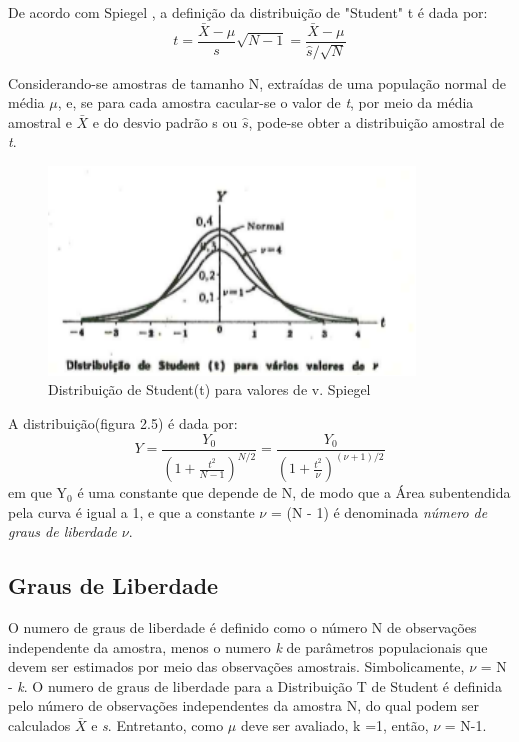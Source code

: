 De acordo com Spiegel \cite{Spiegel:1974}, a definição da distribuição de "Student" t é dada por:
\begin{displaymath} 
\textit{t}= \frac{\bar{X} - \mu }{\textit{s}} \sqrt{N - 1} = \frac{\bar{X} - \mu}{  \hat{s} / \sqrt{N} }
\end{displaymath}

Considerando-se amostras de tamanho N, extraídas de uma população normal de média  $\mu$, e, se para cada amostra cacular-se o valor de \textit{t}, por meio da média amostral e $\bar{X}$ e do desvio padrão s ou $\hat{s}$, pode-se obter a distribuição amostral de \textit{t}.
\begin{figure}[!h]
	\centering
	\includegraphics{distt.pdf}
	\caption{Distribuição de Student(t) para valores de v.  Spiegel \cite{Spiegel:1974}}
	\label{DistribuicaoTparV}
\end{figure}

\newpage
A distribuição(figura 2.5) é dada por:
\begin{displaymath}
Y=\frac{Y_{0}}{\left ( 1 + \frac{\mathit{t}^{2}}{N-1} \right ) ^{N/2}} = \frac{Y_{0}}{\left ( 1 + \frac{\mathit{t}^{2}}{\nu} \right ) ^{\left (\nu+1  \right )/2}}
\end{displaymath}
em que Y$_0$ é uma constante que depende de N, de modo que a Área subentendida pela curva é igual a 1, e que a constante  $\nu$ = (N - 1) é denominada \textit{número de graus de liberdade $\nu$}.
\subsection{Graus de Liberdade}
O numero de graus de liberdade é definido como o número N de observações independente da amostra, menos o numero \textit{k} de parâmetros populacionais que devem ser estimados por meio das observações amostrais. Simbolicamente, $\nu$ = N - \textit{k}.
O numero de graus de liberdade para a Distribuição T de Student é definida pelo número de observações independentes da amostra N, do qual podem ser calculados $\bar{X}$ e \textit{s}. Entretanto, como $\mu$  deve ser avaliado, k =1, então, $\nu$ = N-1.


